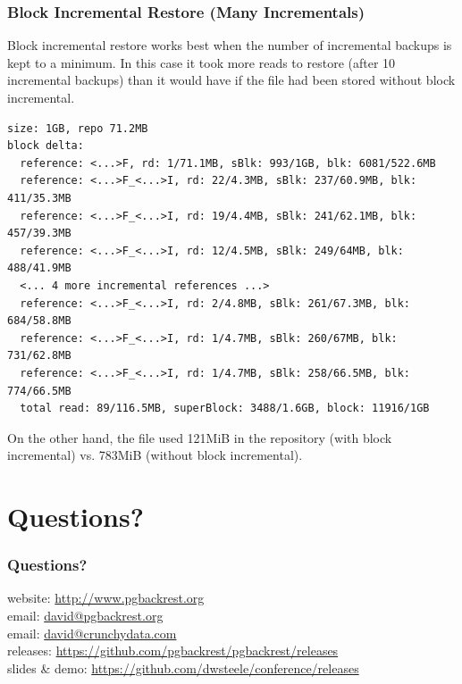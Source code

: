\begin{frame}[fragile]
    \frametitle{Block Incremental Restore (Many Incrementals)}

    Block incremental restore works best when the number of incremental backups is kept to a minimum. In this case it took more reads to restore (after 10 incremental backups) than it would have if the file had been stored without block incremental.

    \begin{verbatim}
size: 1GB, repo 71.2MB
block delta:
  reference: <...>F, rd: 1/71.1MB, sBlk: 993/1GB, blk: 6081/522.6MB
  reference: <...>F_<...>I, rd: 22/4.3MB, sBlk: 237/60.9MB, blk: 411/35.3MB
  reference: <...>F_<...>I, rd: 19/4.4MB, sBlk: 241/62.1MB, blk: 457/39.3MB
  reference: <...>F_<...>I, rd: 12/4.5MB, sBlk: 249/64MB, blk: 488/41.9MB
  <... 4 more incremental references ...>
  reference: <...>F_<...>I, rd: 2/4.8MB, sBlk: 261/67.3MB, blk: 684/58.8MB
  reference: <...>F_<...>I, rd: 1/4.7MB, sBlk: 260/67MB, blk: 731/62.8MB
  reference: <...>F_<...>I, rd: 1/4.7MB, sBlk: 258/66.5MB, blk: 774/66.5MB
  total read: 89/116.5MB, superBlock: 3488/1.6GB, block: 11916/1GB
    \end{verbatim}\vspace{-1em}

    On the other hand, the file used 121MiB in the repository (with block incremental) vs. 783MiB (without block incremental).
\end{frame}

\section{Questions?}

\begin{frame}[fragile]
    \frametitle{Questions?}

    website: \url{http://www.pgbackrest.org}\\
    \vspace{1em}
    email: \href{mailto:david@pgbackrest.org}{david@pgbackrest.org}\\
    email: \href{mailto:david@crunchydata.com}{david@crunchydata.com}\\
    \vspace{1em}
    releases: \url{https://github.com/pgbackrest/pgbackrest/releases}\\
    \vspace{1em}
    slides \& demo: \url{https://github.com/dwsteele/conference/releases}\\
\end{frame}


